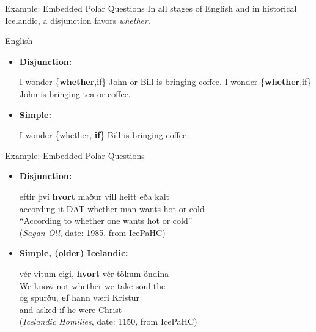 \documentclass[hyperref={pdfpagelabels=false}]{beamer}
\begin{document}
\begin{frame}{Example: Embedded Polar Questions}
		In all stages of English and in historical Icelandic, a disjunction favors {\it whether}.
	\begin{block}{English}
		\begin{itemize}
		\item[ ]\textbf{Disjunction:}
		\begin{exe}
			\ex I wonder \{{\bf whether},if\} John or Bill is bringing coffee.
			\ex I wonder \{{\bf whether},if\} John is bringing tea or coffee.
		\end{exe}
		\item[ ]\textbf{Simple:}
		\begin{exe}
			\ex I wonder \{whether, {\bf if}\} Bill is bringing coffee.
		\end{exe}
		\end{itemize}
	
	\end{block}
\end{frame}

\begin{frame}{Example: Embedded Polar Questions}
		\begin{itemize}
		\item[ ]\textbf{Disjunction:}
		\begin{exe}
			\ex \gll eftir því \textbf{hvort} maður vill heitt eða kalt\\
			according it-DAT whether man wants hot or cold\\
			\quad ``According to whether one wants hot or cold'' \\(\textsl{Sagan Öll}, date: 1985, from IcePaHC\nocite{icepahc09})
		\end{exe}
		\item[ ]\textbf{Simple, (older) Icelandic:}
		\begin{exe}
			\ex \gll vér vitum eigi, \textbf{hvort} vér tökum öndina\\
			We know not whether we take soul-the\\
			\ex \gll og spurðu, \textbf{ef} hann væri Kristur\\
			and asked if he were Christ\\
			(\textsl{Icelandic Homilies}, date: 1150, from IcePaHC)
		\end{exe}
		\end{itemize}		

\end{frame}
\end{document}
